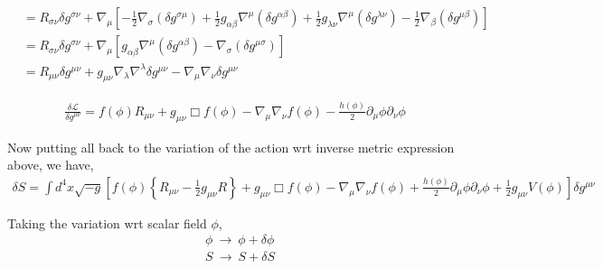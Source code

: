 \begin{align*}
&=R_{\sigma\nu}\delta g^{\sigma\nu} + \nabla_{\mu}\left[-\frac{1}{2}\nabla_{\sigma}\left(\delta g^{\sigma\mu}\right) + \frac{1}{2}g_{\alpha\beta}\nabla^{\mu}\left(\delta g^{\alpha\beta}\right) + \frac{1}{2}g_{\lambda\nu}\nabla^{\mu}\left(\delta g^{\lambda \nu}\right) - \frac{1}{2}\nabla_{\beta}\left(\delta g^{\mu\beta}\right)\right]\\
&=R_{\sigma\nu}\delta g^{\sigma\nu} + \nabla_{\mu}\left[g_{\alpha\beta}\nabla^{\mu}\left(\delta g^{\alpha\beta}\right) - \nabla_{\sigma}\left(\delta g^{\mu\sigma}\right)\right]\\
&=\boxed{R_{\mu\nu}\delta g^{\mu\nu} + g_{\mu\nu}\nabla_{\lambda}\nabla^{\lambda}\delta g^{\mu\nu} - \nabla_{\mu}\nabla_{\nu}\delta g^{\mu\nu}}
\end{align*}

\begin{align*}
\frac{\delta \mathcal{L}}{\delta g^{\mu\nu}} = f\left(\phi\right) R_{\mu\nu} + g_{\mu\nu}\Box f\left(\phi\right) - \nabla_{\mu}\nabla_{\nu}f\left(\phi\right) - \frac{h\left(\phi\right)}{2}\partial_{\mu}\phi\partial_{\nu}\phi
\end{align*}

Now putting all back to the variation of the action wrt inverse metric expression above, we have,
\begin{align}
\boxed{ \delta S = \int d^{4}x \sqrt{-g}\left[f\left(\phi\right)\left\{R_{\mu\nu}-\frac{1}{2}g_{\mu\nu}R\right\} + g_{\mu\nu}\Box f\left(\phi\right) - \nabla_{\mu}\nabla_{\nu}f\left(\phi\right) + \frac{h\left(\phi\right)}{2}\partial_{\mu}\phi\partial_{\nu}\phi + \frac{1}{2}g_{\mu\nu}V\left(\phi\right)\right]\delta g^{\mu\nu}}
\end{align}

Taking the variation wrt scalar field $\phi$,
\begin{align}
    &\phi \ \rightarrow\ \phi + \delta \phi\\
    &S \ \rightarrow\ S + \delta S
\end{align}

